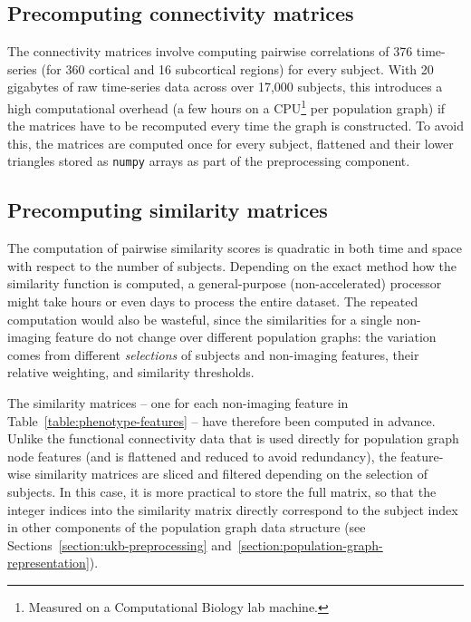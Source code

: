 
\subsection{Precomputing connectivity matrices}
The connectivity matrices involve computing pairwise correlations of 376 time-series (for 360 cortical and 16 subcortical regions) for every subject. With 20 gigabytes of raw time-series data across over 17,000 subjects, this introduces a high computational overhead (a few hours on a CPU\footnote{Measured on a Computational Biology lab machine.} per population graph) if the matrices have to be recomputed every time the graph is constructed. To avoid this, the matrices are computed once for every subject, flattened and their lower triangles stored as \texttt{numpy} arrays as part of the preprocessing component.


\subsection{Precomputing similarity matrices}
The computation of pairwise similarity scores is quadratic in both time and space with respect to the number of subjects. Depending on the exact method how the similarity function is computed, a general-purpose (non-accelerated) processor might take hours or even days to process the entire dataset. The repeated computation would also be wasteful, since the similarities for a single non-imaging feature do not change over different population graphs: the variation comes from different \textit{selections} of subjects and non-imaging features, their relative weighting, and similarity thresholds.

The similarity matrices – one for each non-imaging feature in Table~\ref{table:phenotype-features} – have therefore been computed in advance. Unlike the functional connectivity data that is used directly for population graph node features (and is flattened and reduced to avoid redundancy), the feature-wise similarity matrices are sliced and filtered depending on the selection of subjects. In this case, it is more practical to store the full matrix, so that the integer indices into the similarity matrix directly correspond to the subject index in other components of the population graph data structure (see Sections~\ref{section:ukb-preprocessing} and~\ref{section:population-graph-representation}).


